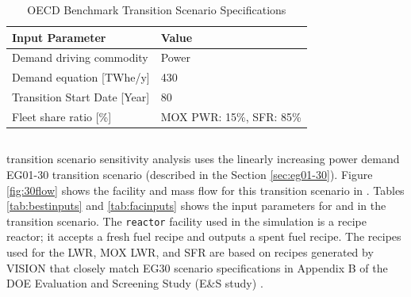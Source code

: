 \begin{table}[H]
    \caption{OECD Benchmark Transition Scenario
	Specifications \cite{oecd_nuclear_energy_agency_wpfc_nodate}}
	\label{tab:dymondinputs}
    \scriptsize
    \begin{tabularx}{\textwidth}{LL}
    \hline
                               \textbf{Input Parameter}            & \textbf{Value}            \\ \hline
    Demand driving commodity   & Power              \\
                               Demand equation {[}TWhe/y{]}   & 430        \\
                               Transition Start Date [Year] & 80\\ 
                               Fleet share ratio [\%] & \gls{MOX} \gls{PWR}: 15\%, \gls{SFR}: 85\%\\ \hline
    \end{tabularx}%
    \end{table}

\subsection{\Cyclus}
\Cyclus transition scenario sensitivity analysis uses 
the linearly increasing power demand EG01-30 transition scenario 
(described in the Section \ref{sec:eg01-30}).  
Figure \ref{fig:30flow} shows the facility and mass flow 
for this transition scenario in \Cyclus. 
Tables \ref{tab:bestinputs} and \ref{tab:facinputs}
shows the input parameters for \deploy and 
in the transition scenario. 
The \texttt{reactor} facility used in the \Cyclus simulation 
is a recipe reactor; it accepts a fresh fuel recipe and outputs 
a spent fuel recipe. 
The recipes used for the \gls{LWR}, \gls{MOX} \gls{LWR}, and 
\gls{SFR} are based on recipes generated by VISION 
\cite{chee_arfc/transition-scenarios_2018}
that closely match EG30 scenario specifications in 
Appendix B of the \gls{DOE} Evaluation and Screening Study 
(E\&S study) \cite{wigeland_nuclear_2014}. 

